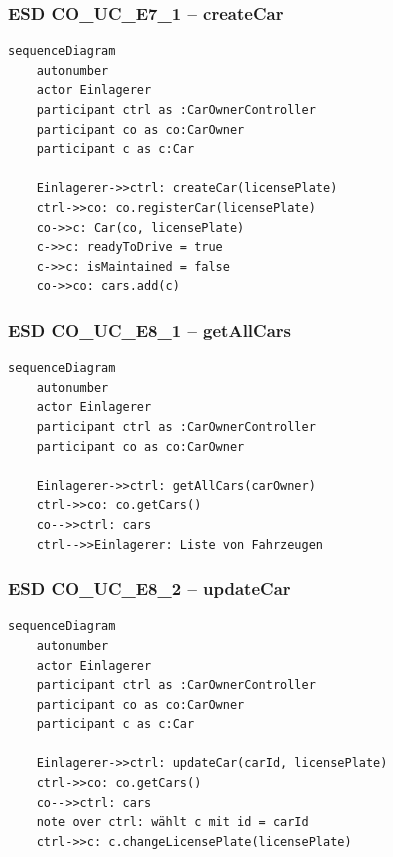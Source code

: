 \subsubsection*{ESD CO\_UC\_E7\_1 – createCar}

\begin{lstlisting}[basicstyle=\ttfamily\small, breaklines=true]
sequenceDiagram
    autonumber
    actor Einlagerer
    participant ctrl as :CarOwnerController
    participant co as co:CarOwner
    participant c as c:Car

    Einlagerer->>ctrl: createCar(licensePlate)
    ctrl->>co: co.registerCar(licensePlate)
    co->>c: Car(co, licensePlate)
    c->>c: readyToDrive = true
    c->>c: isMaintained = false
    co->>co: cars.add(c)
\end{lstlisting}

\newpage

{}
\subsubsection*{ESD CO\_UC\_E8\_1 – getAllCars}

\begin{lstlisting}[basicstyle=\ttfamily\small, breaklines=true]
sequenceDiagram
    autonumber
    actor Einlagerer
    participant ctrl as :CarOwnerController
    participant co as co:CarOwner

    Einlagerer->>ctrl: getAllCars(carOwner)
    ctrl->>co: co.getCars()
    co-->>ctrl: cars
    ctrl-->>Einlagerer: Liste von Fahrzeugen
\end{lstlisting}

\newpage

{}
\subsubsection*{ESD CO\_UC\_E8\_2 – updateCar}

\begin{lstlisting}[basicstyle=\ttfamily\small, breaklines=true]
sequenceDiagram
    autonumber
    actor Einlagerer
    participant ctrl as :CarOwnerController
    participant co as co:CarOwner
    participant c as c:Car

    Einlagerer->>ctrl: updateCar(carId, licensePlate)
    ctrl->>co: co.getCars()
    co-->>ctrl: cars
    note over ctrl: wählt c mit id = carId
    ctrl->>c: c.changeLicensePlate(licensePlate)
\end{lstlisting}

